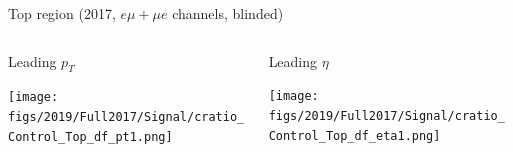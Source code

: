\documentclass[9pt]{beamer}
\begin{document}
\begin{frame}{Top region (2017, $e \mu + \mu e$ channels, blinded)}
\justifying
\begin{columns}
		\hspace{5pt}
		\begin{column}{0.32\textwidth}
			\begin{center}
				\begin{block}{\centering Leading $p_T$}\end{block}	
     			\texttt{[image: figs/2019/Full2017/Signal/cratio\_Control\_Top\_df\_pt1.png]}
    		\end{center}		
		\end{column} \hfill
		\begin{column}{0.32\textwidth}
			\begin{center}
				\begin{block}{\centering Leading $\eta$}\end{block}	
     			\texttt{[image: figs/2019/Full2017/Signal/cratio\_Control\_Top\_df\_eta1.png]}
    		\end{center}		
		\end{column} \hfill
	\end{columns} \vspace{-5pt}
	\begin{columns}
		\hspace{5pt}

\end{columns}
\end{frame}
\end{document}

